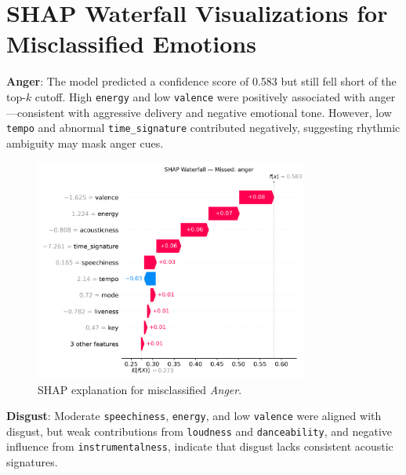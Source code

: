\documentclass{article}
\begin{document}
\newpage

\section{SHAP Waterfall Visualizations for Misclassified Emotions}
\label{appendix:shap_waterfalls}

\textbf{Anger}: The model predicted a confidence score of 0.583 but still fell short of the top-$k$ cutoff. High \texttt{energy} and low \texttt{valence} were positively associated with anger—consistent with aggressive delivery and negative emotional tone. However, low \texttt{tempo} and abnormal \texttt{time\_signature} contributed negatively, suggesting rhythmic ambiguity may mask anger cues.

\begin{figure}[H]
\centering
\includegraphics[width=0.8\textwidth]{Graphics/shap_missed_labels/anger_missed_shap_waterfall.png}
\caption{SHAP explanation for misclassified \textit{Anger}.}
\label{fig:shap_anger_waterfall}
\end{figure}

\textbf{Disgust}: Moderate \texttt{speechiness}, \texttt{energy}, and low \texttt{valence} were aligned with disgust, but weak contributions from \texttt{loudness} and \texttt{danceability}, and negative influence from \texttt{instrumentalness}, indicate that disgust lacks consistent acoustic signatures.
\end{document}
